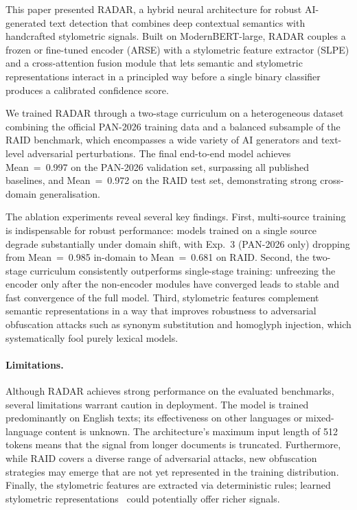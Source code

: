 This paper presented RADAR, a hybrid neural architecture for robust AI-generated text
detection that combines deep contextual semantics with handcrafted stylometric signals.
Built on ModernBERT-large, RADAR couples a frozen or fine-tuned encoder (ARSE) with a
stylometric feature extractor (SLPE) and a cross-attention fusion module that lets
semantic and stylometric representations interact in a principled way before a single
binary classifier produces a calibrated confidence score.

We trained RADAR through a two-stage curriculum on a heterogeneous dataset combining the
official PAN-2026 training data and a balanced subsample of the RAID benchmark, which
encompasses a wide variety of AI generators and text-level adversarial perturbations.
The final end-to-end model achieves Mean~=~0.997 on the PAN-2026 validation set,
surpassing all published baselines, and Mean~=~0.972 on the RAID test set, demonstrating
strong cross-domain generalisation.

The ablation experiments reveal several key findings. First, multi-source training is
indispensable for robust performance: models trained on a single source degrade
substantially under domain shift, with Exp.~3 (PAN-2026 only) dropping from
Mean~=~0.985 in-domain to Mean~=~0.681 on RAID. Second, the two-stage curriculum
consistently outperforms single-stage training: unfreezing the encoder only after the
non-encoder modules have converged leads to stable and fast convergence of the full
model. Third, stylometric features complement semantic representations in a way that
improves robustness to adversarial obfuscation attacks such as synonym substitution
and homoglyph injection, which systematically fool purely lexical models.

\paragraph{Limitations.}
Although RADAR achieves strong performance on the evaluated benchmarks, several
limitations warrant caution in deployment. The model is trained predominantly on
English texts; its effectiveness on other languages or mixed-language content is unknown.
The architecture's maximum input length of 512 tokens means that the signal from longer
documents is truncated. Furthermore, while RAID covers a diverse range of adversarial
attacks, new obfuscation strategies may emerge that are not yet represented in the training
distribution. Finally, the stylometric features are extracted via deterministic rules;
learned stylometric representations~\cite{halvani:2017} could potentially offer richer
signals.

